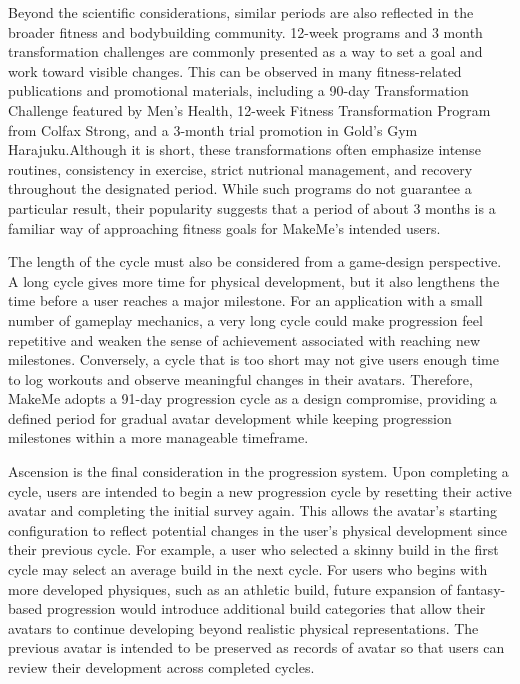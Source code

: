 \documentclass[11pt]{article}
\begin{document}
Beyond the scientific considerations, similar periods are also reflected in the broader fitness
and bodybuilding community. 12-week programs and 3 month transformation challenges are commonly
presented as a way to set a goal and work toward visible changes. This can be observed
in many fitness-related publications and promotional materials, including a 90-day Transformation Challenge
featured by Men's Health\cite{MH2022transformation}, 12-week Fitness Transformation Program from Colfax Strong\cite{pinther2025fitness},
and a 3-month trial promotion in Gold's Gym Harajuku.\cite{goldsgym2026trial}Although it is short, these transformations
often emphasize intense routines, consistency in exercise, strict nutrional management,
and recovery throughout the designated period. While such programs do not guarantee a particular
result, their popularity suggests that a period of about 3 months is a familiar way of approaching fitness
goals for MakeMe's intended users.

The length of the cycle must also be considered from a game-design perspective. A long cycle gives more
time for physical development, but it also lengthens the time before a user reaches a major milestone.
For an application with a small number of gameplay mechanics, a very long cycle could make progression
feel repetitive and weaken the sense of achievement associated with reaching new milestones. Conversely,
a cycle that is too short may not give users enough time to log workouts and observe meaningful changes
in their avatars. Therefore, MakeMe adopts a 91-day progression cycle as a design compromise, providing
a defined period for gradual avatar development while keeping progression milestones within a more
manageable timeframe.

Ascension is the final consideration in the progression system. Upon completing a cycle, users are
intended to begin a new progression cycle by resetting their active avatar and completing the initial survey
again. This allows the avatar's starting configuration to reflect potential changes in the user's
physical development since their previous cycle. For example, a user who selected a skinny build in the
first cycle may select an average build in the next cycle. For users who begins with more developed
physiques, such as an athletic build, future expansion of fantasy-based progression would 
introduce additional build categories that allow their avatars to continue developing beyond realistic
physical representations. The previous avatar is intended to be preserved as records of avatar so that users can review their development across completed cycles. 
\end{document}
